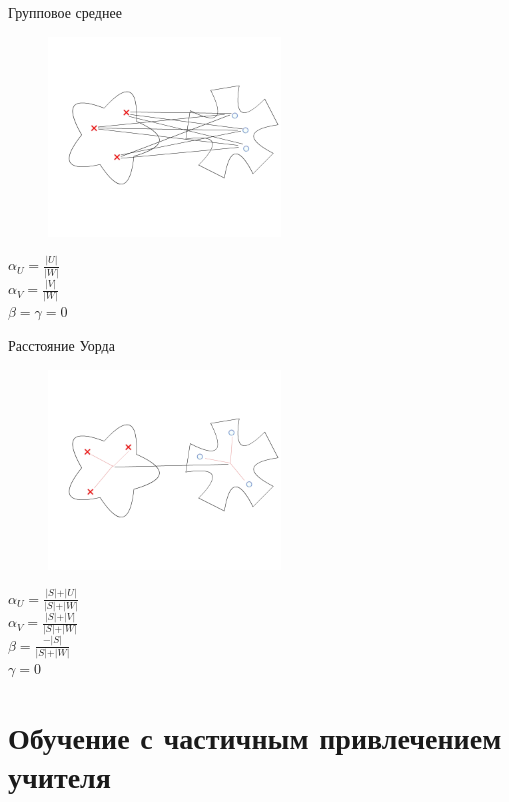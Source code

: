 \documentclass[10pt]{beamer}
\begin{document}
\begin{frame}{Групповое среднее}
	\begin{figure}[htbp]
	  \includegraphics[height=150pt, keepaspectratio = true]{images/lans3}  
	\end{figure}
	${\alpha_U = \frac{\vert U \vert}{\vert W \vert}}$\\${\alpha_V = \frac{\vert V \vert}{\vert W \vert}}$ \\${\beta = \gamma = 0}$
\end{frame}

\begin{frame}{Расстояние Уорда}
	\begin{figure}[htbp]
	  \includegraphics[height=150pt, keepaspectratio = true]{images/lans4}  
	\end{figure}

  ${\alpha_U = \frac{\vert S \vert + \vert U \vert}{\vert S \vert + \vert W \vert}}$\\${\alpha_V = \frac{\vert S \vert + \vert V \vert}{\vert S \vert + \vert W \vert}}$ \\${\beta = \frac{ -\vert S \vert}{\vert S \vert + \vert W \vert}}$ \\${\gamma = 0}$
\end{frame}

\section{Обучение с частичным привлечением учителя}
\end{document}

